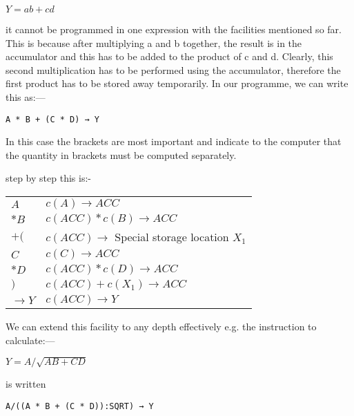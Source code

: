 \documentclass[10pt, a4paper, oneside]{article}
\begin{document}
\begin{multicols}{2}
\begin{addmargin}[1cm]{1em}%
\begin{math}
Y = ab + cd
\end{math}
\end{addmargin}

it cannot be programmed in one expression with the
facilities mentioned so far.  This is because after
multiplying a and b together, the result is in the
accumulator and this has to be added to the product of
c and d.  Clearly, this second multiplication has to
be performed using the accumulator, therefore the first
product has to be stored away temporarily.  In our
programme, we can write this as:—

\begin{addmargin}[1cm]{1em}%
\begin{lstlisting}
A * B + (C * D) → Y
\end{lstlisting}
\end{addmargin}

In this case the brackets are most important and
indicate to the computer that the quantity in
brackets must be computed separately.

step by step this is:-

\begin{tabular}{lp{5.5cm}}
$A$  & $c(A) \rightarrow ACC$ \\
$*B$ & $c(ACC)*c(B) \rightarrow ACC$ \\
$+($ & $c(ACC) \rightarrow$ Special storage location $X_{1}$ \\
$C$  & $c(C) \rightarrow ACC$ \\
$*D$ & $c(ACC)*c(D) \rightarrow ACC$ \\
$)$  & $c(ACC)+c(X_{1}) \rightarrow ACC$ \\
$\rightarrow Y$ & $c(ACC) \rightarrow Y$ \\
\end{tabular}

We can extend this facility to any depth
effectively e.g. the instruction to calculate:—

\begin{addmargin}[1cm]{1em}%
\begin{math}
Y = A/\sqrt{AB+CD}
\end{math}
\end{addmargin}

is written

\begin{addmargin}[1cm]{1em}%
\begin{lstlisting}
A/((A * B + (C * D)):SQRT) → Y
\end{lstlisting}
\end{addmargin}


\end{multicols}
\end{document}
